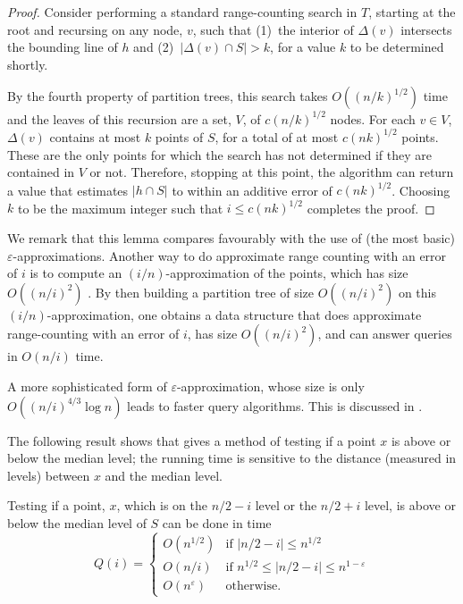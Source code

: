 \documentclass{patmorin}
\newcommand{\eps}{\varepsilon}
\begin{document}
\begin{proof}
  Consider performing a standard range-counting  search in $T$, starting
  at the root and recursing on any node, $v$, such that (1)~the
  interior of $\Delta(v)$ intersects the bounding line of $h$ and
  (2)~$|\Delta(v)\cap S| > k$, for a value $k$ to be determined shortly.

  By the fourth property of partition trees, this search takes
  $O((n/k)^{1/2})$ time and the leaves of this recursion are a set, $V$,
  of $c(n/k)^{1/2}$ nodes.  For each $v\in V$, $\Delta(v)$ contains at
  most $k$ points of $S$, for a total of at most $c(nk)^{1/2}$ points.
  These are the only points for which the search has not determined if
  they are contained in $V$ or not.  Therefore, stopping at this point,
  the algorithm can return a value that estimates $|h\cap S|$ to within
  an additive error of $c(nk)^{1/2}$.  Choosing $k$ to be the maximum
  integer such that $i \le c(nk)^{1/2}$ completes the proof.
\end{proof}

We remark that this lemma compares favourably with the use of (the most
basic) $\eps$-approximations.  Another way to do approximate range
counting with an error of $i$ is to compute an $(i/n)$-approximation
of the points, which has size $O((n/i)^2)$ \cite{lls01,t94}.
By then building a partition tree of size $O((n/i)^2)$ on this
$(i/n)$-approximation, one obtains a data structure that does approximate
range-counting with an error of $i$, has size $O((n/i)^2)$, and can
answer queries in $O(n/i)$ time.

A more sophisticated form of $\eps$-approximation, whose size is only
$O((n/i)^{4/3}\log n)$ leads to faster query algorithms.  This is
discussed in .


The following result shows that  gives a method of
testing if a point $x$ is above or below the median level; the running
time is sensitive to the distance (measured in levels) between $x$
and the median level.

\begin{lem}
  Testing if a point, $x$, which is on the $n/2-i$ level or the $n/2+i$
  level, is above or below the median level of $S$ can be done in time
  \[
       Q(i) = \begin{cases}
          O(n^{1/2}) & \text{if $|n/2-i| \le n^{1/2}$} \\
          O(n/i)      & \text{if $n^{1/2} \le |n/2-i| \le n^{1-\eps}$} \\
          O(n^{\eps}) & \text{otherwise.}
       \end{cases}
  \]
\end{lem}
\end{document}
